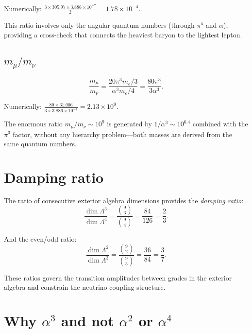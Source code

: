 \documentclass[11pt,letterpaper]{article}
\numberwithin{equation}{section}
\begin{document}
Numerically: $\frac{3 \times 305.97 \times 3.886 \times 10^{-7}}{2} = 1.78 \times 10^{-4}$.

This ratio involves only the angular quantum numbers (through $\pi^5$ and $\alpha$),
providing a cross-check that connects the heaviest baryon to the lightest lepton.

\subsection{$m_\mu / m_\nu$}

\begin{equation}
  \frac{m_\mu}{m_\nu}
  = \frac{20\pi^3 m_e/3}{\alpha^3 m_e/4}
  = \frac{80\pi^3}{3\alpha^3}.
\end{equation}

Numerically: $\frac{80 \times 31.006}{3 \times 3.886 \times 10^{-7}} = 2.13 \times 10^9$.

The enormous ratio $m_\mu/m_\nu \sim 10^9$ is generated by $1/\alpha^3 \sim 10^{6.4}$
combined with the $\pi^3$ factor, without any hierarchy problem---both masses are
derived from the same quantum numbers.

\section{Damping ratio}
\label{sec:damping}

The ratio of consecutive exterior algebra dimensions provides the
\emph{damping ratio}:
\begin{equation}
\label{eq:damping}
  \frac{\dim\Lambda^3}{\dim\Lambda^4} = \frac{\binom{9}{3}}{\binom{9}{4}}
  = \frac{84}{126} = \frac{2}{3}.
\end{equation}

And the even/odd ratio:
\begin{equation}
\label{eq:even_odd}
  \frac{\dim\Lambda^2}{\dim\Lambda^3} = \frac{\binom{9}{2}}{\binom{9}{3}}
  = \frac{36}{84} = \frac{3}{7}.
\end{equation}

These ratios govern the transition amplitudes between grades in the exterior
algebra and constrain the neutrino coupling structure.

\section{Why $\alpha^3$ and not $\alpha^2$ or $\alpha^4$}
\label{sec:why_alpha3}
\end{document}
